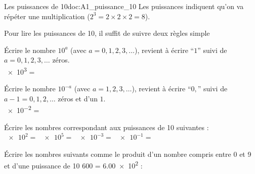 \teteSndMeth

\vspace*{-28pt}


\vspace*{-12pt}

\begin{doc}{Les puissances de 10}{doc:A1_puissance_10}
  Les puissances indiquent qu'on va répéter une multiplication ($2^3 = 2 \times 2 \times 2 = 8$).
  
  Pour lire les puissances de 10, il suffit de suivre deux règles simple
  \begin{encart}
    \pointCyan Écrire le nombre $10^a$ (avec $a = 0, 1, 2, 3, \ldots$), revient à écrire ``$1$'' suivi de $a = 0, 1, 2, 3, \ldots$ zéros. \\
    \exemple \num{e3} = 

    \pointCyan Écrire le nombre $10^{-a}$ (avec $a = 1, 2, 3, \ldots$), revient à écrire ``$0,$'' suivi de $a - 1 = 0, 1, 2, \ldots$ zéros et d'un $1$. \\
    \exemple \num{e-2} = 
  \end{encart}
\end{doc}


\numeroQuestion Écrire les nombres correspondant aux puissances de 10 suivantes : \\
$\num{e2}  =$  \qq{}
$\num{e5}  =$  \qq{}
$\num{e-3} =$  \qq{}
$\num{e-1} =$ 

\numeroQuestion Écrire les nombres suivants comme le produit d'un nombre compris entre 0 et 9 et d'une puissance de 10 \exemple \num{600} = \num{6,00e2} : \\


